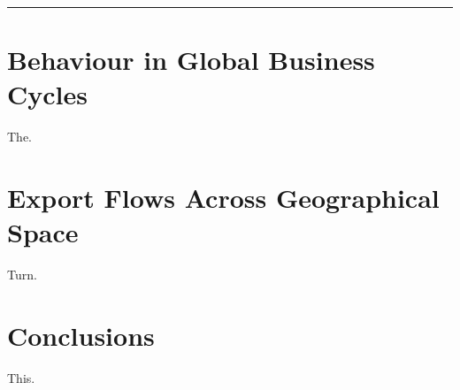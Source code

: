 \documentclass[%
 a4paper,%
 11pt%
]{article}
\begin{document}
\thispagestyle{empty}

\hrule\bigskip



\section{Behaviour in Global Business Cycles}

The.

\section{Export Flows Across Geographical Space}

Turn.

\section{Conclusions}

This.



\end{document}
